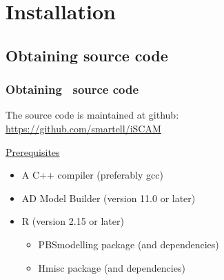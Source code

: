 \section{Installation} %
\label{sec:installation}


\subsection[Source code]{Obtaining source code} %
\label{sub:obtaining_source_code}


\begin{frame}[containsverbatim]
	\frametitle{Obtaining \iscam\ source code}
	The source code is maintained at github:\\
	\url{https://github.com/smartell/iSCAM}
	
	\underline{Prerequisites}
	\begin{itemize}
		\item A C++ compiler (preferably gcc)
		\item AD Model Builder (version 11.0 or later)
		\item R (version 2.15 or later)
		\begin{itemize}
			\item PBSmodelling package (and dependencies)
			\item Hmisc package (and dependencies)
		\end{itemize}
	\end{itemize}

\end{frame}

